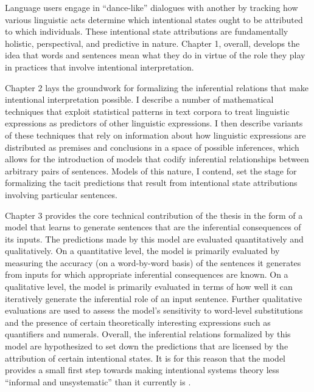 Language users engage in ``dance-like'' dialogues with another by tracking how various linguistic acts determine which intentional states ought to be attributed to which individuals. These intentional state attributions are fundamentally holistic, perspectival, and predictive in nature. Chapter 1, overall, develops the idea that words and sentences mean what they do in virtue of the role they play in practices that involve intentional interpretation.

Chapter 2 lays the groundwork for formalizing the inferential relations that make intentional interpretation possible. I describe a number of mathematical techniques that exploit statistical patterns in text corpora to treat linguistic expressions as predictors of other linguistic expressions. I then describe variants of these techniques that rely on information about how linguistic expressions are distributed as premises and conclusions in a space of possible inferences, which allows for the introduction of models that codify inferential relationships between arbitrary pairs of sentences. Models of this nature, I contend, set the stage for formalizing the tacit predictions that result from intentional state attributions involving particular sentences. 

Chapter 3 provides the core technical contribution of the thesis in the form of a model that learns to generate sentences that are the inferential consequences of its inputs. The predictions made by this model are evaluated quantitatively and qualitatively. On a quantitative level, the model is primarily evaluated by measuring the accuracy (on a word-by-word basis) of the sentences it generates from inputs for which appropriate inferential consequences are known. On a qualitative level, the model is primarily evaluated in terms of how well it can iteratively generate the inferential role of an input sentence. Further qualitative evaluations are used to assess the model's sensitivity to word-level substitutions and the presence of certain theoretically interesting expressions such as quantifiers and numerals. Overall, the inferential relations formalized by this model are hypothesized to set down the predictions that are licensed by the attribution of certain intentional states. It is for this reason that the model provides a small first step towards making intentional systems theory less ``informal and unsystematic'' than it currently is \citep[][p. 67]{Dennett:1987}.

